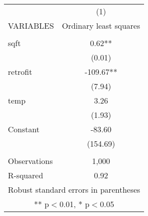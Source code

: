 \begin{tabular}{lc} \hline
 & (1) \\
VARIABLES & Ordinary least squares \\ \hline
 &  \\
sqft & 0.62** \\
 & (0.01) \\
retrofit & -109.67** \\
 & (7.94) \\
temp & 3.26 \\
 & (1.93) \\
Constant & -83.60 \\
 & (154.69) \\
 &  \\
Observations & 1,000 \\
 R-squared & 0.92 \\ \hline
\multicolumn{2}{c}{ Robust standard errors in parentheses} \\
\multicolumn{2}{c}{ ** p$<$0.01, * p$<$0.05} \\
\end{tabular}
